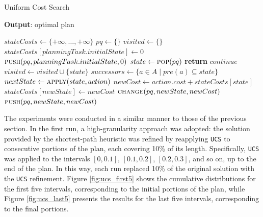 \begin{algorithm}
	\caption{Uniform Cost Search}
	\label{alg:ucs}
	\hspace*{0.5em} \textbf{Output}: optimal plan
	\begin{algorithmic}[1]
		\State $stateCosts \gets \{+\infty, \dots, +\infty\}$ 
		\State $pq \gets \{\}$ 
		\State $visited \gets \{\}$ 
		\State $stateCosts[planningTask.initialState] \gets 0$
		\State $\Call{push}{pq, planningTask.initialState, 0}$ 
		\State $state \gets \Call{pop}{pq}$ 
		\State \textbf{return} 
		\EndIf
		\State $continue$ 
		\EndIf
		\State $visited \gets visited \cup \{state\}$
		\State $successors \gets \{a \in A \mid pre(a) \subseteq state\}$
		\State $nextState \gets \Call{apply}{state, action}$
		\State $newCost \gets action.cost + stateCosts[state]$
		\State $stateCosts[newState] \gets newCost$
		\State $\Call{change}{pq, newState, newCost}$
		\Else
		\State $\Call{push}{pq, newState, newCost}$
		\EndIf
		\EndIf
		\EndFor
		\EndWhile
		\EndProcedure
	\end{algorithmic}
\end{algorithm}

The experiments were conducted in a similar manner to those of the previous section. In the first run, a high-granularity approach was adopted:
the solution provided by the shortest-path heuristic was refined by reapplying \verb|UCS| to consecutive portions of the plan, each covering 10\% of its length.
Specifically, \verb|UCS| was applied to the intervals $[0,0.1]$, $[0.1,0.2]$, $[0.2,0.3]$, and so on, up to the end of the plan. In this way, each run replaced
10\% of the original solution with the \verb|UCS| refinement. Figure \ref{fig:ucs_first5} shows the cumulative distributions for the first five intervals,
corresponding to the initial portions of the plan, while Figure \ref{fig:ucs_last5} presents the results for the last five intervals,
corresponding to the final portions.

